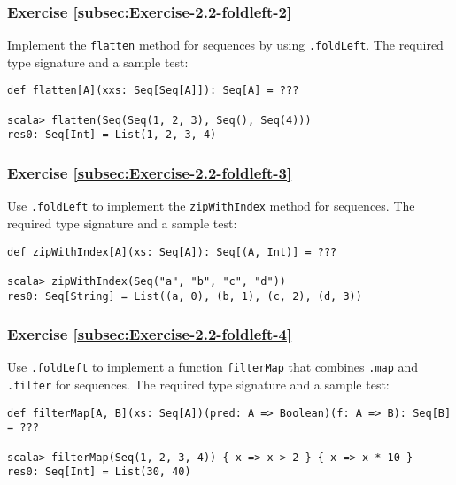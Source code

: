 \subsubsection{Exercise \label{subsec:Exercise-2.2-foldleft-2}\ref{subsec:Exercise-2.2-foldleft-2}}

Implement the \lstinline!flatten!
method for sequences by using \lstinline!.foldLeft!.
The required type signature and a sample test:
\begin{lstlisting}
def flatten[A](xxs: Seq[Seq[A]]): Seq[A] = ???

scala> flatten(Seq(Seq(1, 2, 3), Seq(), Seq(4)))
res0: Seq[Int] = List(1, 2, 3, 4)
\end{lstlisting}

\subsubsection{Exercise \label{subsec:Exercise-2.2-foldleft-3}\ref{subsec:Exercise-2.2-foldleft-3}}

Use \lstinline!.foldLeft!
to implement the \lstinline!zipWithIndex!
method for sequences. The required type signature and a sample test:
\begin{lstlisting}
def zipWithIndex[A](xs: Seq[A]): Seq[(A, Int)] = ???

scala> zipWithIndex(Seq("a", "b", "c", "d"))
res0: Seq[String] = List((a, 0), (b, 1), (c, 2), (d, 3))
\end{lstlisting}

\subsubsection{Exercise \label{subsec:Exercise-2.2-foldleft-4}\ref{subsec:Exercise-2.2-foldleft-4}}

Use \lstinline!.foldLeft!
to implement a function \lstinline!filterMap!
that combines \lstinline!.map!
and \lstinline!.filter!
for sequences. The required type signature and a sample test:
\begin{lstlisting}
def filterMap[A, B](xs: Seq[A])(pred: A => Boolean)(f: A => B): Seq[B] = ???

scala> filterMap(Seq(1, 2, 3, 4)) { x => x > 2 } { x => x * 10 }
res0: Seq[Int] = List(30, 40)
\end{lstlisting}

